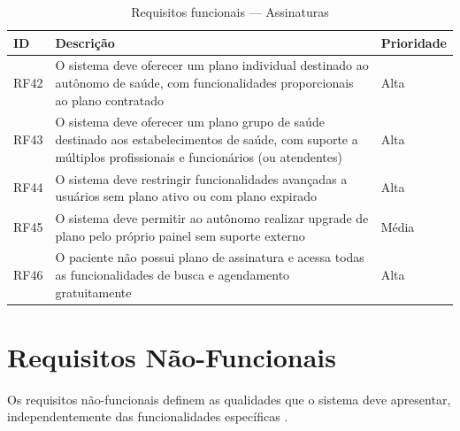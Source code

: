 \begin{table}[H]
  \centering
  \caption{Requisitos funcionais --- Assinaturas}
  \label{tab:subscription-requirements}
  \begin{tabular}{p{1.2cm}p{6.5cm}p{2.5cm}}
    \toprule
    \textbf{ID} &
    \textbf{Descrição} &
    \textbf{Prioridade} \\
    \midrule
    RF42 & O sistema deve oferecer um plano
           individual destinado ao autônomo
           de saúde, com funcionalidades
           proporcionais ao plano contratado
         & Alta \\
    RF43 & O sistema deve oferecer um plano
           grupo de saúde destinado aos estabelecimentos de saúde,
           com suporte a múltiplos profissionais
           e funcionários (ou atendentes)
         & Alta \\
    RF44 & O sistema deve restringir
           funcionalidades avançadas a usuários
           sem plano ativo ou com plano expirado
         & Alta \\
    RF45 & O sistema deve permitir ao autônomo
           realizar upgrade de plano pelo
           próprio painel sem suporte externo
         & Média \\
    RF46 & O paciente não possui plano de
           assinatura e acessa todas as
           funcionalidades de busca e
           agendamento gratuitamente
         & Alta \\
    \bottomrule
  \end{tabular}
\end{table}

\section{Requisitos Não-Funcionais}
\label{sec:non-functional-requirements}

Os requisitos não-funcionais definem as qualidades
que o sistema deve apresentar, independentemente
das funcionalidades específicas \cite{sommerville2011}.

